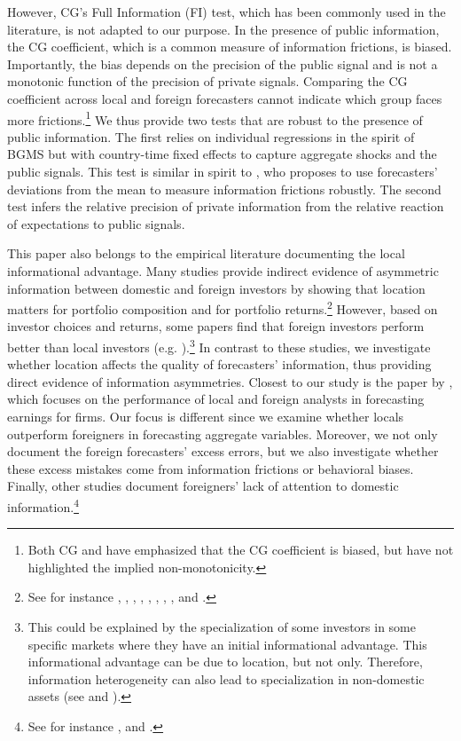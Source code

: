 However, CG's Full Information (FI) test, which has been commonly used in the literature, is not adapted to our purpose. In the presence of public information, the CG coefficient, which is a common measure of information frictions, is biased. Importantly, the bias depends on the precision of the public signal and is not a monotonic function of the precision of private signals. Comparing the CG coefficient across local and foreign forecasters cannot indicate which group faces more frictions.\footnote{Both CG and \citet{Goldstein2021} have emphasized that the CG coefficient is biased, but have not highlighted the implied non-monotonicity.} We thus provide two tests that are robust to the presence of public information. The first relies on individual regressions in the spirit of BGMS but with country-time fixed effects to capture aggregate shocks and the public signals. This test is similar in spirit to \citet{Goldstein2021}, who proposes to use forecasters' deviations from the mean to measure information frictions robustly. The second test infers the relative precision of private information from the relative reaction of expectations to public signals.

This paper also belongs to the empirical literature documenting the local informational advantage. Many studies provide indirect evidence of asymmetric information between domestic and foreign investors by showing that location matters for portfolio composition and for portfolio returns.\footnote{See for instance \citet{KangStulz1997}, \citet{GrinblattKeloharju2001}, \citet{Dvorak2003}, \citet{PortesRey2005}, \citet{Ahearneetal2004}, \citet{Hamaomei2001}, \citet{Hau2001}, \citet{Choeetal2005}, \citet{Baiketal2010} and \citet{Clemensetal2020}.} However, based on investor choices and returns, some papers find that foreign investors perform better than local investors (e.g. \citet{GrinblattKeloharju2000}).\footnote{This could be explained by the specialization of some investors in some specific markets where they have an initial informational advantage. This informational advantage can be due to location, but not only. 
Therefore, information heterogeneity can also lead to specialization in non-domestic assets (see \citet{VanNieuwerburghVeldkamp2010} and \citet{DeMarcoetal2021}).} In contrast to these studies, we investigate whether location affects the quality of forecasters' information, thus providing direct evidence of information asymmetries. Closest to our study is the paper by \citet{Baeetal2008}, which focuses on the performance of local and foreign analysts in forecasting earnings for firms. Our focus is different since we examine whether locals outperform foreigners in forecasting aggregate variables. Moreover, we not only document the foreign forecasters' excess errors, but we also investigate whether these excess mistakes come from information frictions or behavioral biases. Finally, other studies document foreigners' lack of attention to domestic information.\footnote{See for instance \citet{Leuzetal2009}, \citet{Mondriaetal2010} \citet{Huang2015} and \citet{Czirakietal2021}.}

